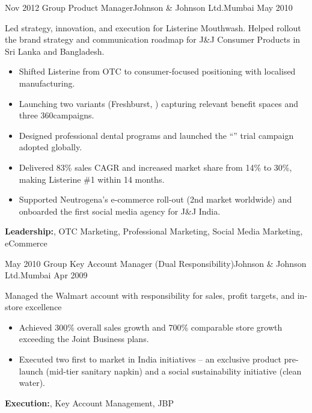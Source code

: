 \begin{experiences}
  \experience
    {Nov 2012}     {Group Product Manager}{Johnson \& Johnson Ltd.}{Mumbai}
    {May 2010}    {
Led strategy, innovation, and execution for Listerine Mouthwash. Helped rollout the brand strategy and communication roadmap for J\&J Consumer Products in Sri Lanka and Bangladesh.
                      \begin{itemize}
        \item {Shifted Listerine from OTC to consumer-focused positioning with localised manufacturing.} 
        \item {Launching two variants (Freshburst, {}) capturing relevant benefit spaces and three 360\textdegree campaigns.}
        \item {Designed professional dental programs and launched the “{}” trial campaign adopted globally.}
        \item {Delivered 83\% sales CAGR and increased market share from 14\% to 30\%, making Listerine \#1 within 14 months.}
        \item {Supported Neutrogena’s e-commerce roll-out (2nd market worldwide) and onboarded the first social media agency for J\&J India.}
                      \end{itemize}
                    }
        {\textbf{Leadership:}, OTC Marketing, Professional Marketing, Social Media Marketing, eCommerce} 

 \experience
  {May 2010}  {Group Key Account Manager (Dual Responsibility)}{Johnson \& Johnson Ltd.}{Mumbai}
  {Apr 2009}   {
Managed the Walmart account with responsibility for sales, profit targets, and in-store excellence
                      \begin{itemize}
        \item {Achieved 300\% overall sales growth and 700\% comparable store growth exceeding the Joint Business plans.}
        \item {Executed two first to market in India initiatives – an exclusive product pre-launch (mid-tier sanitary napkin) and a social sustainability initiative (clean water).}
                      \end{itemize}
                  }
        {\textbf{Execution:}, Key Account Management, JBP}
 

\end{experiences}
